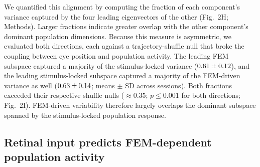 \documentclass{lite}
\begin{document}
We quantified this alignment by computing the fraction of each component's variance captured by the four leading eigenvectors of the other (Fig.~2H; Methods). Larger fractions indicate greater overlap with the other component's dominant population dimensions. Because this measure is asymmetric, we evaluated both directions, each against a trajectory-shuffle null that broke the coupling between eye position and population activity. The leading FEM subspace captured a majority of the stimulus-locked variance ($0.61\pm0.12$), and the leading stimulus-locked subspace captured a majority of the FEM-driven variance as well ($0.63\pm0.14$; means $\pm$ SD across sessions). Both fractions exceeded their respective shuffle nulls ($\approx 0.35$; $p \leq 0.001$ for both directions; Fig.~2I). FEM-driven variability therefore largely overlaps the dominant subspace spanned by the stimulus-locked population response. 



\subsection{Retinal input predicts FEM-dependent population activity}
\end{document}
